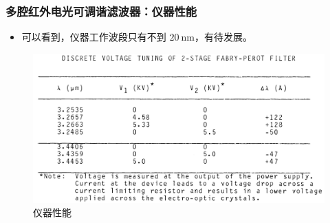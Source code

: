 \begin{frame}[c]
    \frametitle{多腔红外电光可调谐滤波器：仪器性能}
    \begin{itemize}
        \item 可以看到，仪器工作波段只有不到 $20\ \mathrm{nm}$，有待发展。
    \end{itemize}

    \begin{figure}[H] %
        \centering %
        \includegraphics[width=1.\textwidth]{figures/Multiple-Cavity Infrared Electro-Optic Tunable Filter_3.png} %
        \caption{仪器性能}
    \end{figure}
\end{frame}